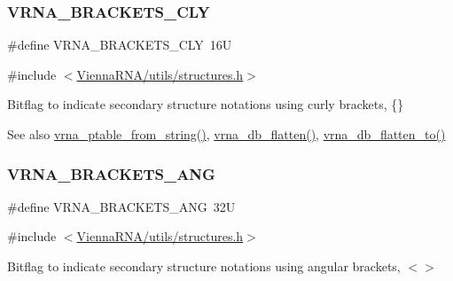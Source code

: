 \subsubsection{\texorpdfstring{V\+R\+N\+A\+\_\+\+B\+R\+A\+C\+K\+E\+T\+S\+\_\+\+C\+LY}{VRNA\_BRACKETS\_CLY}}
{\footnotesize\ttfamily \#define V\+R\+N\+A\+\_\+\+B\+R\+A\+C\+K\+E\+T\+S\+\_\+\+C\+LY~16U}



{\ttfamily \#include $<$\hyperlink{utils_2structures_8h}{Vienna\+R\+N\+A/utils/structures.\+h}$>$}



Bitflag to indicate secondary structure notations using curly brackets, {\ttfamily \{\}} 

\begin{DoxySeeAlso}{See also}
\hyperlink{group__struct__utils__pair__table_gac76c9ef3de507748fb0416a59323362b}{vrna\+\_\+ptable\+\_\+from\+\_\+string()}, \hyperlink{group__struct__utils__dot__bracket_gae966b9f44168a4f4b39ca42ffb5f37b7}{vrna\+\_\+db\+\_\+flatten()}, \hyperlink{group__struct__utils__dot__bracket_ga690425199c8b71545e7196e3af1436f8}{vrna\+\_\+db\+\_\+flatten\+\_\+to()} 
\end{DoxySeeAlso}
\mbox{\label{group__struct__utils__dot__bracket_ga863e03f7f73f10fc9bbcbefbdda4bec8}} 
\subsubsection{\texorpdfstring{V\+R\+N\+A\+\_\+\+B\+R\+A\+C\+K\+E\+T\+S\+\_\+\+A\+NG}{VRNA\_BRACKETS\_ANG}}
{\footnotesize\ttfamily \#define V\+R\+N\+A\+\_\+\+B\+R\+A\+C\+K\+E\+T\+S\+\_\+\+A\+NG~32U}



{\ttfamily \#include $<$\hyperlink{utils_2structures_8h}{Vienna\+R\+N\+A/utils/structures.\+h}$>$}



Bitflag to indicate secondary structure notations using angular brackets, {\ttfamily $<$$>$} 

